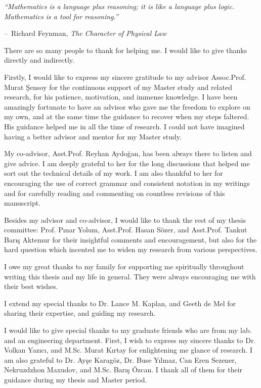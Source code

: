 \documentclass[a4,12pt]{ozu-thesis}
\makeatletter
\newenvironment{chapquote}[2][2em]
  {\setlength{\@tempdima}{#1}%
   \def\chapquote@author{#2}%
   \parshape 1 \@tempdima \dimexpr\textwidth-2\@tempdima\relax%
   \itshape}
  {\par\normalfont\hfill--\ \chapquote@author\hspace*{\@tempdima}\par\bigskip}
\makeatother
\begin{document}
\begin{preliminary}
\begin{ozetce}
\end{ozetce}

\begin{acknowledgements}
\begin{chapquote}
{Richard Feynman, \textit{The Character of Physical Law}}
``Mathematics is a language plus reasoning; it is like a language plus logic. Mathematics is a tool for reasoning.''
\end{chapquote}

There are so many people to thank for helping me. I would like to give thanks directly and indirectly.

Firstly, I would like to express my sincere gratitude to my advisor Assoc.Prof. Murat \c{S}ensoy  for the continuous support of my Master study and related research, for his patience, motivation, and immense knowledge.  I have been amazingly fortunate to have an advisor who gave me the freedom to explore on my own, and at the same time the guidance to recover when my steps faltered. His guidance helped me in all the time of research. I could not have imagined having a better advisor and mentor for my Master study.

My co-advisor, Asst.Prof. Reyhan Aydo\u{g}an, has been always there to listen and give advice. I am deeply grateful to her for the long discussions that helped me sort out the technical details of my work. I am also thankful to her for encouraging the use of correct grammar and consistent notation in my writings and for carefully reading and commenting on countless revisions of this manuscript.

Besides my advisor and co-advisor, I would like to thank the rest of my thesis committee: Prof. P{\i}nar Yolum, Asst.Prof. Hasan S\"{o}zer, and Asst.Prof. Tankut Bar{\i}\c{s} Aktemur for their insightful comments and encouragement, but also for the hard question which incented me to widen my research from various perspectives.

I owe my great thanks to my family for supporting me spiritually throughout writing this thesis and my life in general. They were always encouraging me with their best wishes.

I extend my special thanks to Dr. Lance M. Kaplan, and Geeth de Mel for sharing their expertise, and guiding my research.

I would like to give special thanks to my graduate friends who are from my lab. and an engineering department. First, I wish to express my sincere thanks to Dr. Volkan Yaz{\i}c{\i}, and M.Sc. Murat K{\i}rtay for enlightening me glance of research. I am also grateful to Dr. Ay\c{s}e Karag\"{o}z, Dr. Buse Y{\i}lmaz, Can Eren Sezener, Nekruzdzhon Maxudov, and M.Sc. Bar{\i}\c{s} \"{O}zcan. I thank all of them for their guidance during my thesis and Master period.


\end{acknowledgements}
\end{preliminary}
\end{document}
